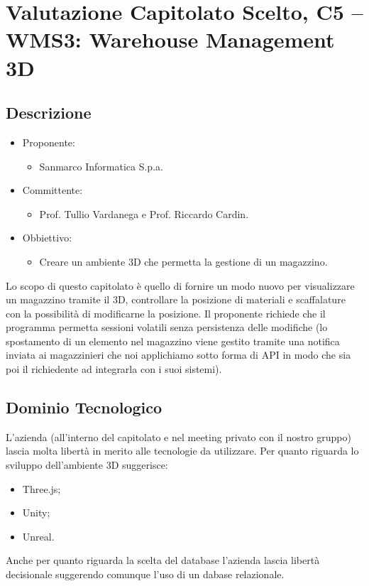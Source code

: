 \documentclass[a4paper, twoside]{article}
\begin{document}
\large

\newpage %

\tableofcontents
\newpage



\section{Valutazione Capitolato Scelto, C5 -- WMS3: Warehouse Management 3D}
    \subsection{Descrizione}
        \begin{itemize}
            \item Proponente:
            \begin{itemize}
                \item Sanmarco Informatica S.p.a.
            \end{itemize}
            \item Committente:
            \begin{itemize}
                \item Prof. Tullio Vardanega e Prof.
                Riccardo Cardin.
            \end{itemize}
            \item Obbiettivo:
            \begin{itemize}
                \item Creare un ambiente 3D che permetta la gestione
                di un magazzino.
            \end{itemize}
        \end{itemize}
        Lo scopo di questo capitolato è quello di fornire un
        modo nuovo per visualizzare un magazzino tramite il
        3D, controllare la posizione di materiali e scaffalature con
        la possibilità di modificarne la posizione.
        Il proponente richiede che il programma permetta sessioni
        volatili senza persistenza delle modifiche (lo spostamento di
        un elemento nel magazzino viene gestito tramite una notifica
        inviata ai magazzinieri che noi applichiamo sotto forma di API
        in modo che sia poi il richiedente ad integrarla con i suoi
        sistemi).
    \subsection{Dominio Tecnologico}
        L'azienda (all'interno del capitolato e nel meeting privato
        con il nostro gruppo) lascia molta libertà in merito alle
        tecnologie da utilizzare. Per quanto riguarda lo sviluppo
        dell'ambiente 3D suggerisce:
        \begin{itemize}
            \item Three.js;
            \item Unity;
            \item Unreal.
        \end{itemize}
        Anche per quanto riguarda la scelta del database l'azienda
        lascia libertà decisionale suggerendo comunque l'uso di un
        dabase relazionale.
\end{document}
